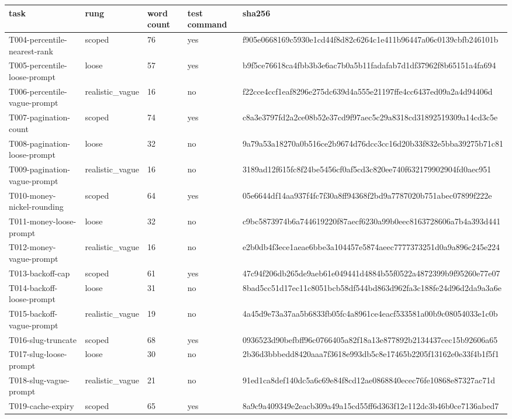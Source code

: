 \begin{tabular}{lllll}
\toprule
task & rung & word count & test command & sha256 \\
\midrule
T004-percentile-nearest-rank & scoped & 76 & yes & f905e0668169c5930e1cd44f8d82c6264c1e411b96447a06c0139cbfb246101b \\
T005-percentile-loose-prompt & loose & 57 & yes & b9f5ce76618ca4fbb3b3e6ac7b0a5b11fadafab7d1df37962f8b65151a4fa694 \\
T006-percentile-vague-prompt & realistic\_vague & 16 & no & f22cce4ccf1eaf8296e275dc639d4a555e21197ffe4cc6437ed09a2a4d94406d \\
T007-pagination-count & scoped & 74 & yes & c8a3e3797fd2a2ce08b52e37cd9f97aec5c29a8318cd31892519309a14cd3c5e \\
T008-pagination-loose-prompt & loose & 32 & no & 9a79a53a18270a0b516ce2b9674d76dcc3cc16d20b33f832e5bba39275b71c81 \\
T009-pagination-vague-prompt & realistic\_vague & 16 & no & 3189ad12f615fc8f24be5456cf0af5cd3c820ee740f632179902904fd0aec951 \\
T010-money-nickel-rounding & scoped & 64 & yes & 05e6644df14aa937f4fc7f30a8ff94368f2bd9a7787020b751abec07899f222e \\
T011-money-loose-prompt & loose & 32 & no & c9bc5873974b6a744619220f87aecf6230a99b0eec8163728606a7b4a393d441 \\
T012-money-vague-prompt & realistic\_vague & 16 & no & e2b0db4f3ece1aeae6bbe3a104457e5874aeec7777373251d0a9a896c245e224 \\
T013-backoff-cap & scoped & 61 & yes & 47c94f206db265de9aeb61e049441d4884b55f0522a4872399b9f95260e77e07 \\
T014-backoff-loose-prompt & loose & 31 & no & 8bad5cc51d17ec11c8051bcb58df544bd863d962fa3c188fe24d96d2da9a3a6e \\
T015-backoff-vague-prompt & realistic\_vague & 19 & no & 4a45d9e73a37aa5b6833fb05fc4a8961ce4eacf533581a00b9c08054033e1c0b \\
T016-slug-truncate & scoped & 68 & yes & 0936523d90befbff96c0766405a82f18a13e877892b2134437cec15b92606a65 \\
T017-slug-loose-prompt & loose & 30 & no & 2b36d3bbbedd8420aaa7f3618e993db5c8e17465b2205f13162e0e33f4b1f5f1 \\
T018-slug-vague-prompt & realistic\_vague & 21 & no & 91ed1ca8def140dc5a6c69e84f8cd12ae0868840ecec76fe10868e87327ac71d \\
T019-cache-expiry & scoped & 65 & yes & 8a9c9a409349e2eacb309a49a15cd55ff6d363f12e112dc3b46b0ce7136abed7 \\

\end{tabular}
